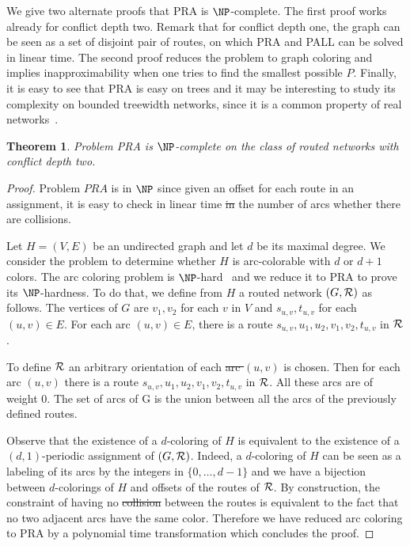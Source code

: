 \documentclass[10pt, conference, letterpaper]{IEEEtran}
\newtheorem{theorem}{Theorem}
\providecommand{\DIFaddtex}[1]{{\protect\color{blue}\uwave{#1}}} %
\providecommand{\DIFdeltex}[1]{{\protect\color{red}\sout{#1}}}                      %
\providecommand{\DIFaddbegin}{} %
\providecommand{\DIFaddend}{} %
\providecommand{\DIFdelbegin}{} %
\providecommand{\DIFdelend}{} %
\providecommand{\DIFadd}[1]{\texorpdfstring{\DIFaddtex{#1}}{#1}} %
\providecommand{\DIFdel}[1]{\texorpdfstring{\DIFdeltex{#1}}{}} %
\newcommand{\DIFscaledelfig}{0.5}
\newlength{\DIFdelgraphicswidth} %
\newlength{\DIFdelgraphicsheight} %
\newcommand{\DIFaddincludegraphics}[2][]{{\color{blue}\fbox{\DIFOincludegraphics[#1]{#2}}}} %
\newcommand{\DIFdelincludegraphics}[2][]{%
\sbox{\DIFdelgraphicsbox}{\DIFOincludegraphics[#1]{#2}}%
\settoboxwidth{\DIFdelgraphicswidth}{\DIFdelgraphicsbox} %
\settoboxtotalheight{\DIFdelgraphicsheight}{\DIFdelgraphicsbox} %
\scalebox{\DIFscaledelfig}{%
\parbox[b]{\DIFdelgraphicswidth}{\usebox{\DIFdelgraphicsbox}\\[-\baselineskip] \rule{\DIFdelgraphicswidth}{0em}}\llap{\resizebox{\DIFdelgraphicswidth}{\DIFdelgraphicsheight}{%
\setlength{\unitlength}{\DIFdelgraphicswidth}%
\begin{picture}(1,1)%
\thicklines\linethickness{2pt} %
{\color[rgb]{1,0,0}\put(0,0){\framebox(1,1){}}}%
{\color[rgb]{1,0,0}\put(0,0){\line( 1,1){1}}}%
{\color[rgb]{1,0,0}\put(0,1){\line(1,-1){1}}}%
\end{picture}%
}\hspace*{3pt}}} %
} %
\DeclareRobustCommand{\DIFaddbegin}{\DIFOaddbegin \let\includegraphics\DIFaddincludegraphics} %
\DeclareRobustCommand{\DIFaddend}{\DIFOaddend \let\includegraphics\DIFOincludegraphics} %
\DeclareRobustCommand{\DIFdelbegin}{\DIFOdelbegin \let\includegraphics\DIFdelincludegraphics} %
\DeclareRobustCommand{\DIFdelend}{\DIFOaddend \let\includegraphics\DIFOincludegraphics} %
\begin{document}
We give two alternate proofs that PRA is $\NP$-complete.
The first proof works already for conflict depth two. Remark that for conflict depth one,
the graph can be seen as a set of disjoint pair of routes, on which PRA and PALL can be solved in linear time. 
 The second proof reduces the problem to graph coloring and implies inapproximability when one tries to find the smallest possible $P$.  \DIFdelbegin %
\DIFdelend Finally, it is easy to see that PRA is easy on trees and it may be interesting to study its complexity on 
 bounded treewidth networks, since it is a common property of real networks~\cite{de2011treewidth}.


 \begin{theorem}
Problem PRA is $\NP$-complete on the class of routed networks with conflict depth two.
\end{theorem}
 \begin{proof}
 Problem $PRA$ is in $\NP$ since given an offset for each route in an assignment, it is easy to check in linear time \DIFdelbegin \DIFdel{in }\DIFdelend \DIFaddbegin \DIFadd{with regard to }\DIFaddend the number of arcs whether there are collisions.

  Let $H=(V,E)$ be an undirected graph and let $d$ be its maximal degree. We consider the problem to determine whether $H$ is arc-colorable  with $d$ or $d+1$ colors. The arc coloring problem is $\NP$-hard~\cite{holyer1981np} and we reduce it to PRA to prove its $\NP$-hardness. To do that, we define from $H$ a routed network $(G,{\cal R})$ as follows.
  The vertices of $G$ are $v_1, v_2$ for each $v$ in $V$ and $s_{u,v}, t_{u,v}$ for each $(u,v) \in E$.
  For each arc $(u,v) \in E$, there is a route $s_{u,v},u_1,u_2,v_1,v_2,t_{u,v}$ in ${\cal R}$. 

   To define ${\cal R}$ an arbitrary orientation of each \DIFdelbegin \DIFdel{arc $(u,v)$ }\DIFdelend \DIFaddbegin \DIFadd{edge }\DIFaddend is chosen. 
   Then for each arc $(u,v)$ there is a route $s_{u,v},u_1,u_2,v_1,v_2,t_{u,v}$ in ${\cal R}$.
  All these arcs are of weight $0$. The set of arcs of G is the union between all the arcs of the previously defined routes.

  Observe that the existence of a $d$-coloring of $H$ is equivalent to the existence of a $(d,1)$-periodic assignment
  of $(G,{\cal R})$. Indeed, a $d$-coloring of $H$ can be seen as a labeling of its arcs by the integers
  in $\{0,\dots,d-1\}$ and we have a bijection between $d$-colorings of $H$ and offsets of the routes of ${\cal R}$.
  By construction, the constraint of having no \DIFdelbegin \DIFdel{collision }\DIFdelend \DIFaddbegin \DIFadd{collisions }\DIFaddend between the routes is equivalent to the fact that no two adjacent arcs have the same color. Therefore we have reduced arc coloring to PRA by a polynomial time transformation which concludes the proof. 
 \end{proof}
\end{document}
